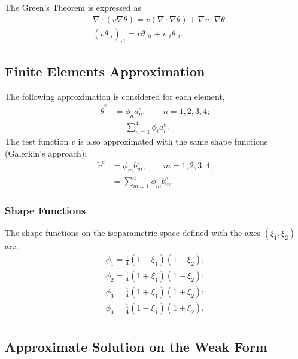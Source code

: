 \documentclass[10pt, a4paper]{article}
\begin{document}
The Green's Theorem is expressed as
\begin{align*}
&\nabla \cdot (v \nabla \theta ) = v \left( \nabla \cdot \nabla \theta \right) + \nabla v \cdot \nabla \theta \\
&(v \theta_{,i})_{,i} = v \theta_{,ii} + v_{,i} \theta_{,i}.
\end{align*}


\subsection{Finite Elements Approximation}

The following approximation is considered for each element,
\begin{align*}
\tilde{\theta}^e &= \phi_n a_n^e, \qquad n=1,2,3,4;\\
&= \sum_{n=1}^4 \phi_i a_i^e.
\end{align*}
The test function $v$ is also approximated with the same shape functions (Galerkin's approach):
\begin{align*}
\tilde{v}^e &= \phi_m b_m^e, \qquad m=1,2,3,4;\\
&= \sum_{m=1}^4 \phi_m b_m^e.
\end{align*}

\subsubsection{Shape Functions}

The shape functions on the isoparametric space defined with the axes $(\xi_1, \xi_2)$ are:
\begin{align*}
\phi_1 = \frac{1}{4} (1 - \xi_1)(1 - \xi_2); \\
\phi_2 = \frac{1}{4} (1 + \xi_1)(1 - \xi_2); \\
\phi_3 = \frac{1}{4} (1 + \xi_1)(1 + \xi_2) ;\\
\phi_4 = \frac{1}{4} (1 - \xi_1)(1 + \xi_2) .\\
\end{align*}

\subsection{Approximate Solution on the Weak Form}
\end{document}

